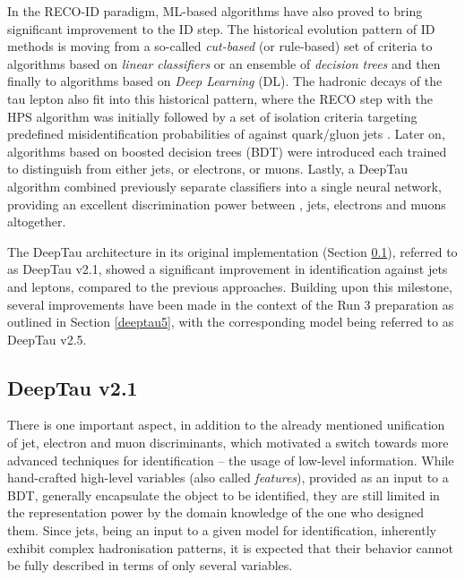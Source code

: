 In the RECO-ID paradigm, ML-based algorithms have also proved to bring significant improvement to the ID step. The historical evolution pattern of ID methods is moving from a so-called \textit{cut-based} (or rule-based) set of criteria to algorithms based on \textit{linear classifiers} or an ensemble of \textit{decision trees} and then finally to algorithms based on \textit{Deep Learning} (DL). The hadronic decays of the tau lepton also fit into this historical pattern, where the RECO step with the HPS algorithm was initially followed by a set of isolation criteria targeting predefined misidentification probabilities of \tauh against quark/gluon jets \cite{cms2012performance}. Later on, algorithms based on boosted decision trees (BDT) were introduced \cite{CMS:2015pac, CMS:2018jrd} each trained to distinguish \tauh from either jets, or electrons, or muons. Lastly, a DeepTau algorithm \cite{CMS:2022prd} combined previously separate classifiers into a single neural network, providing an excellent discrimination power between \tauh, jets, electrons and muons altogether. 

The DeepTau architecture in its original implementation (Section \ref{deeptau1}), referred to as DeepTau v2.1, showed a significant improvement in \tauh identification against jets and leptons, compared to the previous approaches. Building upon this milestone, several improvements have been made in the context of the Run 3 preparation as outlined in Section \ref{deeptau5}, with the corresponding model being referred to as DeepTau v2.5. 

\subsection{DeepTau v2.1} \label{deeptau1}
There is one important aspect, in addition to the already mentioned unification of jet, electron and muon discriminants, which motivated a switch towards more advanced techniques for \tauh identification -- the usage of low-level information. While hand-crafted high-level variables (also called \textit{features}), provided as an input to a BDT, generally encapsulate the object to be identified, they are still limited in the representation power by the domain knowledge of the one who designed them. Since jets, being an input to a given model for \tauh identification, inherently exhibit complex hadronisation patterns, it is expected that their behavior cannot be fully described in terms of only several variables.

